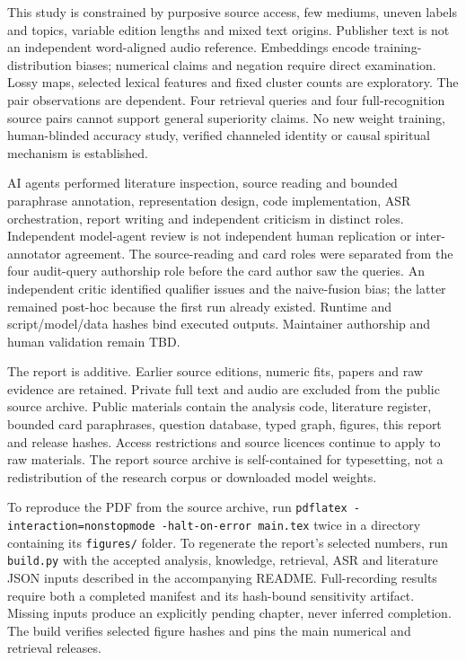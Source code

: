 \documentclass[
  10pt,
]{article}
\begin{document}
This study is constrained by purposive source access, few mediums,
uneven labels and topics, variable edition lengths and mixed text
origins. Publisher text is not an independent word-aligned audio
reference. Embeddings encode training-distribution biases; numerical
claims and negation require direct examination. Lossy maps, selected
lexical features and fixed cluster counts are exploratory. The pair
observations are dependent. Four retrieval queries and four
full-recognition source pairs cannot support general superiority claims.
No new weight training, human-blinded accuracy study, verified channeled
identity or causal spiritual mechanism is established.

AI agents performed literature inspection, source reading and bounded
paraphrase annotation, representation design, code implementation, ASR
orchestration, report writing and independent criticism in distinct
roles. Independent model-agent review is not independent human
replication or inter-annotator agreement. The source-reading and card
roles were separated from the four audit-query authorship role before
the card author saw the queries. An independent critic identified
qualifier issues and the naive-fusion bias; the latter remained post-hoc
because the first run already existed. Runtime and script/model/data
hashes bind executed outputs. Maintainer authorship and human validation
remain TBD.

The report is additive. Earlier source editions, numeric fits, papers
and raw evidence are retained. Private full text and audio are excluded
from the public source archive. Public materials contain the analysis
code, literature register, bounded card paraphrases, question database,
typed graph, figures, this report and release hashes. Access
restrictions and source licences continue to apply to raw materials. The
report source archive is self-contained for typesetting, not a
redistribution of the research corpus or downloaded model weights.

To reproduce the PDF from the source archive, run
\texttt{pdflatex\ -interaction=nonstopmode\ -halt-on-error\ main.tex}
twice in a directory containing its \texttt{figures/} folder. To
regenerate the report's selected numbers, run \texttt{build.py} with the
accepted analysis, knowledge, retrieval, ASR and literature JSON inputs
described in the accompanying README. Full-recording results require
both a completed manifest and its hash-bound sensitivity artifact.
Missing inputs produce an explicitly pending chapter, never inferred
completion. The build verifies selected figure hashes and pins the main
numerical and retrieval releases.
\end{document}
